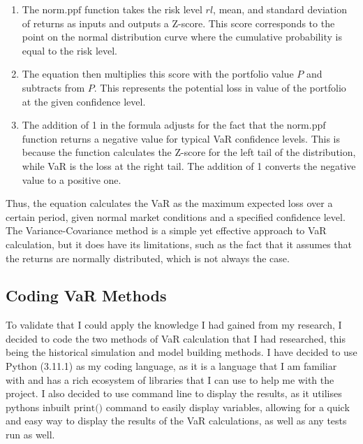 \documentclass{article}
\begin{document}
\begin{enumerate}
    \item The \(\text{norm.ppf}\) function takes the risk level \( rl \), mean, and standard deviation of returns as inputs and outputs a Z-score. This score corresponds to the point on the normal distribution curve where the cumulative probability is equal to the risk level.
    \item The equation then multiplies this score with the portfolio value \( P \) and subtracts from \( P \). This represents the potential loss in value of the portfolio at the given confidence level.
    \item The addition of 1 in the formula adjusts for the fact that the \(\text{norm.ppf}\) function returns a negative value for typical VaR confidence levels. This is because the function calculates the Z-score for the left tail of the distribution, while VaR is the loss at the right tail. The addition of 1 converts the negative value to a positive one.
\end{enumerate}

Thus, the equation calculates the VaR as the maximum expected loss over a certain period, given normal market conditions and a specified confidence level. The Variance-Covariance method is a simple yet effective approach to VaR calculation, but it does have its limitations, such as the fact that it assumes that the returns are normally distributed, which is not always the case.\\\vspace{0.3cm}




\subsection{Coding VaR Methods}
To validate that I could apply the knowledge I had gained from my research, I decided to code the two methods of VaR calculation that I had researched, this being the historical simulation and model building methods. I have decided to use Python (3.11.1) as my coding language, as it is a language that I am familiar with and has a rich ecosystem of libraries that I can use to help me with the project. I also decided to use command line to display the results, as it utilises pythons inbuilt \(\text{print()}\) command to easily display variables, allowing for a quick and easy way to display the results of the VaR calculations, as well as any tests run as well. %
\\\vspace{0.3cm}
\end{document}
